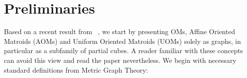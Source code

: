 \documentclass[final,11pt]{article}
\begin{document}
\section{Preliminaries}\label{sec:prel}


Based on a recent result from ~\cite{Kna-17}, we start by presenting OMs, Affine Oriented Matroids (AOMs) and Uniform Oriented Matroids (UOMs)  solely as graphs, in particular as a subfamily of partial cubes. A reader familiar with these concepts can avoid this view and read the paper nevertheless. %
We begin with necessary standard definitions from Metric Graph Theory:
\end{document}

